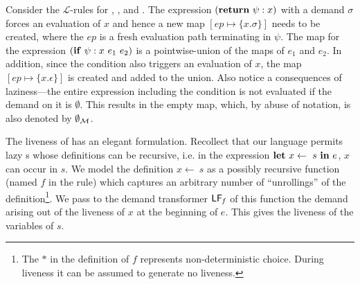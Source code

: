 \documentclass[9pt]{sigplanconf}
\newcommand{\mycomment}[1]{}
\begin{document}
Consider  the $\mathcal{L}$-rules for  {\LET}, {\SIF},  and {\SRETURN}.
The  expression $(\mbox{$\mathbf{ return}$}~\psi:x)$  with a  demand $\sigma$  forces an
evaluation  of   $x$  and  hence  a  new   map  $[\mathit{ep}  \mapsto
  \{x.\sigma\}] $  needs to  be created, where the $ep$ is a fresh
evaluation path terminating in $\psi$.  The  map for  the expression
$(\mbox{$\mathbf{ if}$}~\psi:x~e_1~e_2)$ is a pointwise-union  of the maps of $e_1$ and
$e_2$. In addition, since the condition also triggers an evaluation of
$x$,  the map  $[\mathit{ep} \mapsto  \{x.\epsilon\}]$ is  created and
added  to the  union.  Also  notice a  consequences  of laziness---the
entire  expression including  the condition  is not  evaluated  if the
demand on it is $\emptyset$.  This results in the empty map, which, by
abuse of notation, is also denoted by $\emptyset_{\cal{M}}$.



 The liveness  of {\LET} has  an elegant formulation.   Recollect that
 our language permits lazy {\LET}s whose definitions can be recursive,
 i.e.  in the expression $\mbox{$\mathbf{ let}$}~x \leftarrow~s~\mbox{$\mathbf{ in}$}~e$, $x$ can occur in
 $s$.   We  model  the  definition  $x  \leftarrow~s$  as  a  possibly
 recursive function (named $\mathit{f}$ in the rule) which captures an
 arbitrary number of ``unrollings'' of the definition\footnote{The $*$
   in  the definition  of ${\mathit  f}$  represents non-deterministic
   choice.  During   liveness  it  can  be  assumed   to  generate  no
   liveness.}.   We pass to  the demand  transformer $\mathsf{LF}_{\mathit
   f}$ of this function the demand  arising out of the liveness of $x$
 at the beginning of $e$. This  gives the liveness of the variables of
 $s$.


\mycomment{The function  $\mathcal{L}$ now gives  the (total) liveness
  of  an   expression  $e$.   The  cases  $\SRETURN$   and  $\SIF$  are
  straightforward, but note the liveness $x.\epsilon$ generated by the
  latter.   The case  $(\LET\  z\leftarrow s\  \IN\  e')$ resembles  a
  three-address instruction:  the liveness of  $e$ is given  by taking
  the liveness, $\Lv$, of $e'$, killing any liveness of $z$ and adding
  any incremental  liveness from  $s$.  The main  subtlety is  how the
  liveness of  $z$ in $\Lv$  is converted to  a demand $\Lv(z)$  to be
  placed on $s$ via $\mathit{ref}(s,\Lv(z),\Lfonly)$.


We make three observations: firstly the rule ({\sc live-define}) has a
least  solution  as  $\mathcal{L}(\cdot)$  is monotonic  in  $\sigma$;
secondly  that  ({\sc  live-define})   resembles  the  rule  for  type
inference of mutually recursive  function definitions, and thirdly the
asymmetry of  demand and liveness (compared to  post- and pre-liveness
classically) is due to the functional formulation here.
}%
\end{document}
